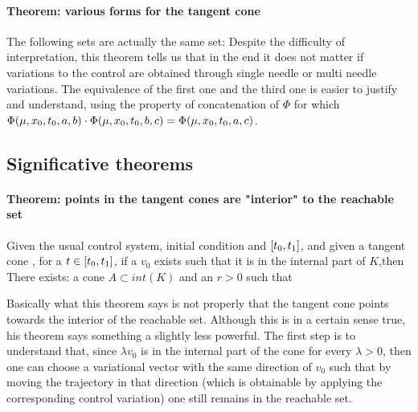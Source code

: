 \paragraph[lemma 5.5]{Theorem: various forms for the tangent cone}
The following sets are actually the same set: 
Despite the difficulty of interpretation, this theorem tells us that in the end it does not matter if variations to the control are obtained through single needle or multi needle variations. The equivalence of the first one and the third one is easier to justify and understand, using the property of concatenation of $\Phi$ for which $\Phi(\mu,x_0,t_0,a,b)\cdot\Phi(\mu,x_0,t_0,b,c)=\Phi(\mu,x_0,t_0,a,c)$.


\subsection{Significative theorems}
\paragraph[5.10]{Theorem: points in the tangent cones are "interior" to the reachable set}
Given the usual control system, initial condition and $[t_0,t_1]$, and given a tangent cone , for a $t\in[t_0,t_1]$, if a $v_0$ exists such that it is in the internal part of $K$,then\\
There exists: a cone $A\subset int(K)$ and an $r>0$ such that 

Basically what this theorem says is not properly that the tangent cone points towards the interior of the reachable set. Although this is in a certain sense true, his theorem says something a slightly less powerful. The first step is to understand that, since $\lambda v_0$ is in the internal part of the cone for every $\lambda>0$, then one can choose a variational vector with the same direction of $v_0$ such that by moving the trajectory in that direction (which is obtainable by applying the corresponding control variation) one still remains in the reachable set. 

